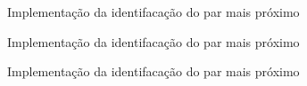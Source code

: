 

\begin{frame}[fragile]{Implementação da identifacação do par mais próximo}
\end{frame}

\begin{frame}[fragile]{Implementação da identifacação do par mais próximo}
\end{frame}

\begin{frame}[fragile]{Implementação da identifacação do par mais próximo}
\end{frame}





